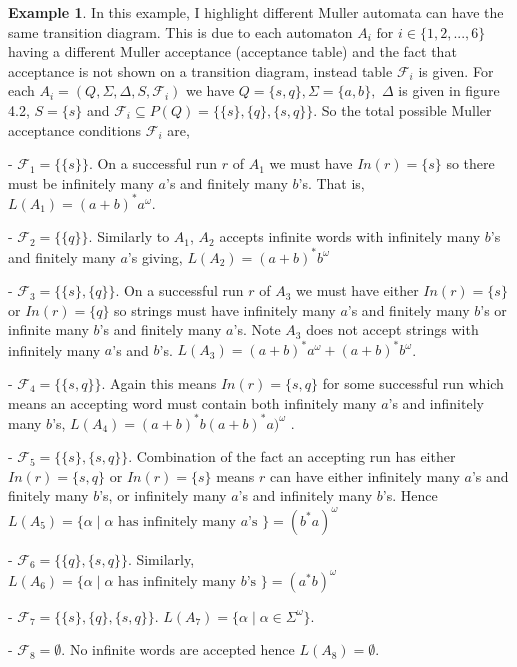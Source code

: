 \documentclass[a4paper,12pt]{report}
\theoremstyle{definition}
\newtheorem{exmp}{Example}[subsection]
\begin{document}
\begin{exmp}
In this example, I highlight different Muller automata can have the same transition diagram. This is due to each automaton $A_i \text{ for } i\in\{1,2,...,6\}$ having a different Muller acceptance (acceptance table) and the fact that acceptance is not shown on a transition diagram, instead table $\mathcal{F}_i$ is given. For each 
$A_i=(Q,\Sigma, \Delta, S, \mathcal{F}_i)$ we have $Q=\{s,q\}, \Sigma=\{a,b\},$  $\Delta$ is given in figure 4.2, $S=\{s\}$ and $\mathcal{F}_i\subseteq P(Q)=\{\{s\},\{q\},\{s,q\}\}$. So the total possible Muller acceptance conditions $\mathcal{F}_i$ are, 

\noindent - $\mathcal{F}_1=\{\{s\}\}$. On a successful run $r$ of $A_1$ we must have $In(r)=\{s\}$ so there must be infinitely many $a$'s and finitely many $b$'s. That is, $L(A_1)=(a+b)^*a^\omega$.


\noindent - $\mathcal{F}_2=\{\{q\}\}$. Similarly to $A_1$, $A_2$ accepts infinite words with infinitely many $b$'s and finitely many $a$'s giving, $L(A_2)=(a+b)^*b^\omega$

\noindent - $\mathcal{F}_3=\{\{s\},\{q\}\}$. On a successful run $r$ of $A_3$ we must have either $In(r)=\{s\}$ or  $In(r)=\{q\}$ so strings must have infinitely many $a$'s and finitely many $b$'s or infinite many $b$'s and finitely many $a$'s. Note $A_3$ does not accept strings with infinitely many $a$'s and $b$'s. $L(A_3)= (a+b)^*a^\omega + (a+b)^*b^\omega$.

\noindent - $\mathcal{F}_4=\{\{s,q\}\}$. Again this means $In(r)=\{s,q\}$ for some successful run which means an accepting word must contain both infinitely many $a$'s and infinitely many $b$'s, $L(A_4)=(a+b)^*b(a+b)^*a)^\omega$ .

\noindent - $\mathcal{F}_5=\{\{s\},\{s,q\}\}$. Combination of the fact an accepting run has either $In(r)=\{s,q\}$ or $In(r)=\{s\}$ means $r$ can have either infinitely many $a$'s and finitely many $b$'s, or infinitely many $a$'s and infinitely many $b$'s. Hence $L(A_5)=\{\alpha \mid \alpha \text{ has infinitely many } a\text{'s }\}=(b^*a)^\omega$

\noindent - $\mathcal{F}_6=\{\{q\},\{s,q\}\}$. Similarly, $L(A_6)=\{\alpha \mid \alpha \text{ has infinitely many } b\text{'s }\}=(a^*b)^\omega$

\noindent - $\mathcal{F}_7=\{\{s\},\{q\},\{s,q\}\}$. $L(A_7)= \{\alpha\mid\alpha\in\Sigma^\omega\}$.

\noindent - $\mathcal{F}_8=\emptyset$. No infinite words are accepted hence $L(A_8)= \emptyset$.




\end{exmp}
\end{document}
